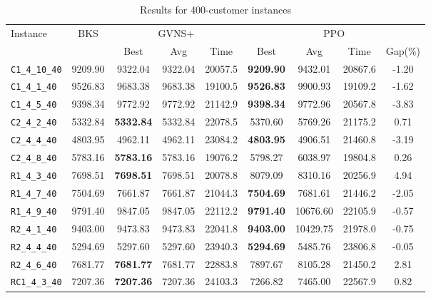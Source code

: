 \begin{table}[ht]
\centering
\small
\setlength{\tabcolsep}{5pt}
\caption{Results for 400-customer instances}
\vspace{4mm}
\begin{adjustbox}{width=\textwidth}
\begin{tabular}{l c c c c @{\hspace{8pt}} c c c c @{\hspace{8pt}}}
\toprule
\multirow{2}{*}{Instance} & \multirow{2}{*}{BKS} & \multicolumn{3}{c}{GVNS+} & \multicolumn{4}{c}{PPO} \\
\cmidrule(lr){3-5} \cmidrule(lr){6-9}
 &  & Best & Avg & Time & Best & Avg & Time & Gap(\%) \\
\midrule
\texttt{C1\_4\_10\_40} & 9209.90 & 9322.04 & 9322.04 & 20057.5 & \textbf{9209.90} & 9432.01 & 20867.6 & -1.20 \\
\texttt{C1\_4\_1\_40} & 9526.83 & 9683.38 & 9683.38 & 19100.5 & \textbf{9526.83} & 9900.93 & 19109.2 & -1.62 \\
\texttt{C1\_4\_5\_40} & 9398.34 & 9772.92 & 9772.92 & 21142.9 & \textbf{9398.34} & 9772.96 & 20567.8 & -3.83 \\
\texttt{C2\_4\_2\_40} & 5332.84 & \textbf{5332.84} & 5332.84 & 22078.5 & 5370.60 & 5769.26 & 21175.2 & 0.71 \\
\texttt{C2\_4\_4\_40} & 4803.95 & 4962.11 & 4962.11 & 23084.2 & \textbf{4803.95} & 4906.51 & 21460.8 & -3.19 \\
\texttt{C2\_4\_8\_40} & 5783.16 & \textbf{5783.16} & 5783.16 & 19076.2 & 5798.27 & 6038.97 & 19804.8 & 0.26 \\
\texttt{R1\_4\_3\_40} & 7698.51 & \textbf{7698.51} & 7698.51 & 20078.8 & 8079.09 & 8310.16 & 20256.9 & 4.94 \\
\texttt{R1\_4\_7\_40} & 7504.69 & 7661.87 & 7661.87 & 21044.3 & \textbf{7504.69} & 7681.61 & 21446.2 & -2.05 \\
\texttt{R1\_4\_9\_40} & 9791.40 & 9847.05 & 9847.05 & 22112.2 & \textbf{9791.40} & 10676.60 & 22105.9 & -0.57 \\
\texttt{R2\_4\_1\_40} & 9403.00 & 9473.83 & 9473.83 & 22041.8 & \textbf{9403.00} & 10429.75 & 21978.0 & -0.75 \\
\texttt{R2\_4\_4\_40} & 5294.69 & 5297.60 & 5297.60 & 23940.3 & \textbf{5294.69} & 5485.76 & 23806.8 & -0.05 \\
\texttt{R2\_4\_6\_40} & 7681.77 & \textbf{7681.77} & 7681.77 & 22883.8 & 7897.67 & 8105.28 & 21450.2 & 2.81 \\
\texttt{RC1\_4\_3\_40} & 7207.36 & \textbf{7207.36} & 7207.36 & 24103.3 & 7266.82 & 7465.00 & 22567.9 & 0.82 \\

\end{tabular}
\end{adjustbox}
\end{table}
